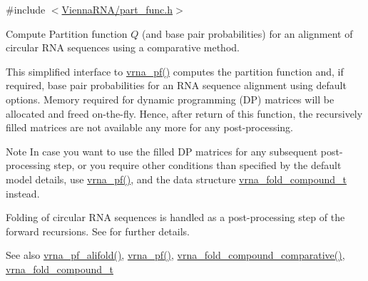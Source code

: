 {\ttfamily \#include $<$\hyperlink{part__func_8h}{Vienna\+R\+N\+A/part\+\_\+func.\+h}$>$}



Compute Partition function $Q$ (and base pair probabilities) for an alignment of circular R\+NA sequences using a comparative method. 

This simplified interface to \hyperlink{group__part__func__global_ga29e256d688ad221b78d37f427e0e99bc}{vrna\+\_\+pf()} computes the partition function and, if required, base pair probabilities for an R\+NA sequence alignment using default options. Memory required for dynamic programming (DP) matrices will be allocated and free\textquotesingle{}d on-\/the-\/fly. Hence, after return of this function, the recursively filled matrices are not available any more for any post-\/processing.

\begin{DoxyNote}{Note}
In case you want to use the filled DP matrices for any subsequent post-\/processing step, or you require other conditions than specified by the default model details, use \hyperlink{group__part__func__global_ga29e256d688ad221b78d37f427e0e99bc}{vrna\+\_\+pf()}, and the data structure \hyperlink{group__fold__compound_ga1b0cef17fd40466cef5968eaeeff6166}{vrna\+\_\+fold\+\_\+compound\+\_\+t} instead.
\end{DoxyNote}
Folding of circular R\+NA sequences is handled as a post-\/processing step of the forward recursions. See \cite{hofacker:2006} for further details.

\begin{DoxySeeAlso}{See also}
\hyperlink{group__part__func__global_ga374e31a0f326b2c5da5b84e143a63f38}{vrna\+\_\+pf\+\_\+alifold()}, \hyperlink{group__part__func__global_ga29e256d688ad221b78d37f427e0e99bc}{vrna\+\_\+pf()}, \hyperlink{group__fold__compound_gad6bacc816af274922b13d947f708aa0c}{vrna\+\_\+fold\+\_\+compound\+\_\+comparative()}, \hyperlink{group__fold__compound_ga1b0cef17fd40466cef5968eaeeff6166}{vrna\+\_\+fold\+\_\+compound\+\_\+t}
\end{DoxySeeAlso}

